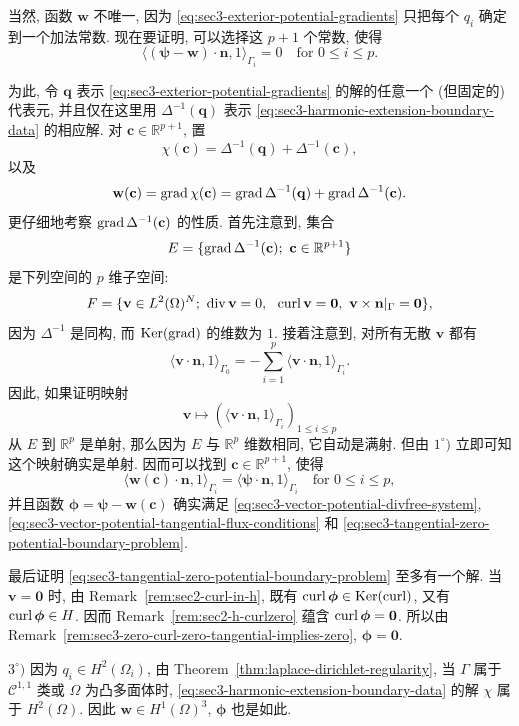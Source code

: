 \begin{Proof}
当然, 函数 $\mathbf w$ 不唯一, 因为
\eqref{eq:sec3-exterior-potential-gradients} 只把每个 $q_i$ 确定到一个加法常数.
现在要证明, 可以选择这 $p+1$ 个常数, 使得
\[
\langle(\boldsymbol\psi-\mathbf w)\cdot\mathbf n,1\rangle_{\Gamma_i}=0
\quad\text{for }0\le i\le p.
\]

为此, 令 $\mathbf q$ 表示 \eqref{eq:sec3-exterior-potential-gradients} 的解的任意一个
(但固定的)代表元, 并且仅在这里用 $\Delta^{-1}(\mathbf q)$ 表示
\eqref{eq:sec3-harmonic-extension-boundary-data} 的相应解. 对
$\mathbf c\in\mathbb R^{p+1}$, 置
\[
\chi(\mathbf c)=\Delta^{-1}(\mathbf q)+\Delta^{-1}(\mathbf c),
\]
以及
\[
\mathbf w(\mathbf c)=\operatorname{grad}\chi(\mathbf c)
=\operatorname{grad}\Delta^{-1}(\mathbf q)+\operatorname{grad}\Delta^{-1}(\mathbf c).
\]
更仔细地考察 $\operatorname{grad}\Delta^{-1}(\mathbf c)$ 的性质. 首先注意到, 集合
\[
E=\{\operatorname{grad}\Delta^{-1}(\mathbf c);\ \mathbf c\in\mathbb R^{p+1}\}
\]
是下列空间的 $p$ 维子空间:
\[
F=\{\mathbf v\in L^2(\Omega)^N;\ \Div\mathbf v=0,\
\ \Curl\mathbf v=\mathbf0,\ \mathbf v\times\mathbf n|_\Gamma=\mathbf0\},
\]
因为 $\Delta^{-1}$ 是同构, 而 $\operatorname{Ker}(\operatorname{grad})$ 的维数为 $1$.
接着注意到, 对所有无散 $\mathbf v$ 都有
\[
\langle\mathbf v\cdot\mathbf n,1\rangle_{\Gamma_0}
=-\sum_{i=1}^p\langle\mathbf v\cdot\mathbf n,1\rangle_{\Gamma_i}.
\]
因此, 如果证明映射
\[
\mathbf v\mapsto
(\langle\mathbf v\cdot\mathbf n,1\rangle_{\Gamma_i})_{1\le i\le p}
\]
从 $E$ 到 $\mathbb R^p$ 是单射, 那么因为 $E$ 与 $\mathbb R^p$ 维数相同,
它自动是满射. 但由 $1^\circ)$ 立即可知这个映射确实是单射. 因而可以找到
$\mathbf c\in\mathbb R^{p+1}$, 使得
\[
\langle\mathbf w(\mathbf c)\cdot\mathbf n,1\rangle_{\Gamma_i}
=\langle\boldsymbol\psi\cdot\mathbf n,1\rangle_{\Gamma_i}
\quad\text{for }0\le i\le p,
\]
并且函数 $\boldsymbol\phi=\boldsymbol\psi-\mathbf w(\mathbf c)$
确实满足 \eqref{eq:sec3-vector-potential-divfree-system},
\eqref{eq:sec3-vector-potential-tangential-flux-conditions} 和
\eqref{eq:sec3-tangential-zero-potential-boundary-problem}.

最后证明 \eqref{eq:sec3-tangential-zero-potential-boundary-problem} 至多有一个解.
当 $\mathbf v=\mathbf0$ 时, 由 Remark~\ref{rem:sec2-curl-in-h},
既有 $\operatorname{curl}\boldsymbol\phi\in\operatorname{Ker}(\operatorname{curl})$,
又有 $\operatorname{curl}\boldsymbol\phi\in H$. 因而 Remark~\ref{rem:sec2-h-curlzero}
蕴含 $\operatorname{curl}\boldsymbol\phi=\mathbf0$. 所以由
Remark~\ref{rem:sec3-zero-curl-zero-tangential-implies-zero},
$\boldsymbol\phi=\mathbf0$.

$3^\circ)$ 因为 $q_i\in H^2(\Omega_i)$, 由
Theorem~\ref{thm:laplace-dirichlet-regularity}, 当 $\Gamma$ 属于
$\mathcal C^{1,1}$ 类或 $\Omega$ 为凸多面体时,
\eqref{eq:sec3-harmonic-extension-boundary-data} 的解 $\chi$ 属于 $H^2(\Omega)$.
因此 $\mathbf w\in H^1(\Omega)^3$, $\boldsymbol\phi$ 也是如此.
\end{Proof}


